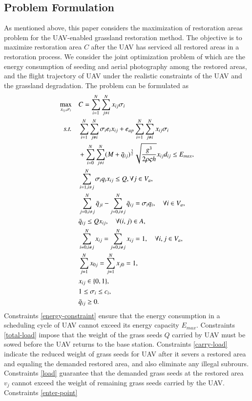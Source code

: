 \documentclass[preprint,5pt]{elsarticle}
\begin{document}
\subsection{Problem Formulation} \label{Problem-Formulation}
As mentioned above, this paper considers the maximization of restoration areas problem for the UAV-enabled grassland restoration method. The objective is to maximize restoration area $C$ after the UAV has serviced all restored areas in a restoration process. We consider the joint optimization problem of which are the energy consumption of seeding and aerial photography among the restored areas, and the flight trajectory of UAV under the realistic constraints of the UAV and the grassland degradation. The problem can be formulated as
\begin{subequations}\label{GRP}
\begin{align}
\max_{x_{ij},\sigma_i} \quad &C = \sum^N_{i = 1}\sum^N_{j \neq i} x_{ij}\sigma_i\\
\emph{s.t.} \quad &\sum^N_{i = 1}\sum^N_{j \neq i}\sigma_i e_i x_{ij} + e_{ap}\sum^N_{i=1}\sum^N_{j \neq i} x_{ij}\sigma_i \nonumber\\
& + \sum^N_{i=0}\sum^N_{j \neq i} (M + \bar{q}_{ij})^{\frac{3}{2}}\sqrt{\frac{g^3}{2 \rho \varsigma h}} x_{ij} d_{ij} \leq E_{max}, \label{energy-constraint}\\
&\sum^N_{i=1, i\neq j} \sigma_i q_i x_{ij} \leq Q, \forall j \in V_a,\label{total-load}\\
&\sum^N_{j=0, i\neq j}\bar{q}_{ji} -  \sum^N_{j=0, i\neq j}\bar{q}_{ij} = \sigma_i q_i, \label{carry-load} \quad \forall i \in V_a,\\
&\bar{q}_{ij} \leq Q x_{ij}, \quad \forall (i,j) \in A, \label{load}\\
&\sum^N_{i=0, i\neq j} x_{ij} = \sum^N_{j=0,i\neq j} x_{ij} = 1, \quad \forall i,j \in V_a, \label{enter-point}\\
&\sum^N_{j=1} x_{0j} = \sum^N_{j=1} x_{j0} = 1, \label{start-point}\\
&x_{ij} \in \{0,1\}, \label{binary-variable} \\
&1 \leq \sigma_i \leq c_i, \label{area-constraint}\\
& \bar{q}_{ij} \geq 0. \label{flight-weight}
\end{align}
\end{subequations}
Constraints \eqref{energy-constraint} ensure that the energy consumption in a scheduling cycle of UAV cannot exceed its energy capacity $E_{max}$. Constraints \eqref{total-load} impose that the weight of the grass seeds $Q$ carried by UAV must be sowed before the UAV returns to the base station. Constraints \eqref{carry-load} indicate the reduced weight of grass seeds for UAV after it severs a restored area and equaling the demanded restored area, and also eliminate any illegal subrours. Constraints \eqref{load} guarantee that the demanded grass seeds at the restored area $v_j$ cannot exceed the weight of remaining grass seeds carried by the UAV. Constraints \eqref{enter-point}
\end{document}
